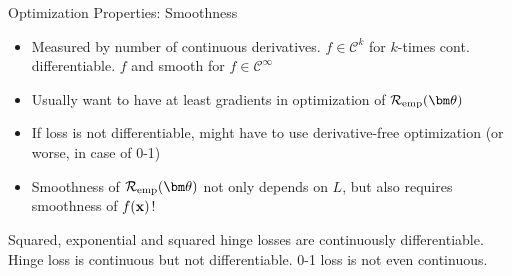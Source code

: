 \documentclass[11pt,compress,t,notes=noshow, xcolor=table]{beamer}
\begin{document}

\begin{frame}{Optimization Properties: Smoothness}


\begin{itemize}
\item Measured by number of continuous derivatives. $f \in \mathcal{C}^k$ for $k$-times cont. differentiable. $f$ and smooth for $f \in \mathcal{C}^{\infty}$
\item Usually want to have at least gradients in optimization of $\risket$
\item If loss is not differentiable, might have to use derivative-free optimization (or worse, in case of 0-1)
\item Smoothness of $\risket$ not only depends on $L$, but also requires smoothness of $f(\mathbf{x})$! 
\end{itemize}

\vfill

%
{
\raggedright {\footnotesize
Squared, exponential and squared hinge losses are continuously 
differentiable. Hinge loss is continuous but not differentiable. 
0-1 loss is not even continuous.}
}%





\end{frame}
\end{document}

